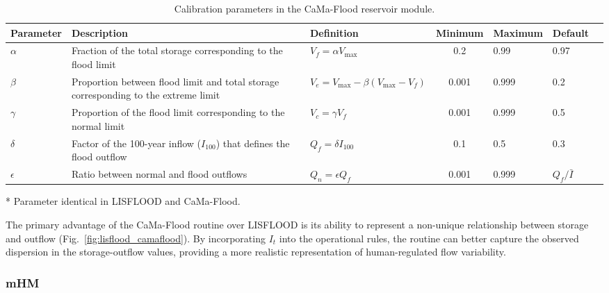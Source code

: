 \documentclass[hess, manuscript]{copernicus}
\begin{document}
\begin{table}[t]
    \centering
    \begin{threeparttable}
        \caption{Calibration parameters in the CaMa-Flood reservoir module.}
        \label{tab:parameters_camaflood}
        \begin{tabularx}{\textwidth}{lXlclll}
            \toprule
            \textbf{Parameter} & \textbf{Description} & \textbf{Definition} & \textbf{Minimum} & \textbf{Maximum} & \textbf{Default} \\
            \midrule
            $\alpha$\tnote{*} & Fraction of the total storage corresponding to the flood limit & $V_f = \alpha V_{\max}$ & 0.2 & 0.99 & 0.97 \\
            $\beta$ & Proportion between flood limit and total storage corresponding to the extreme limit & $V_e = V_{\max} - \beta (V_{\max} - V_f)$ & 0.001 & 0.999 & 0.2 \\
            $\gamma$ & Proportion of the flood limit corresponding to the normal limit & $V_c = \gamma V_f$ & 0.001 & 0.999 & 0.5 \\
            $\delta$\tnote{*} & Factor of the 100-year inflow ($I_{100}$) that defines the flood outflow & $Q_f = \delta I_{100}$ & 0.1 & 0.5 & 0.3 \\
            $\epsilon$\tnote{*} & Ratio between normal and flood outflows & $Q_n = \epsilon Q_f$ & 0.001 & 0.999 & $Q_f / \bar{I}$ \\
             \bottomrule
        \end{tabularx}
        \begin{tablenotes}
            \small
            \item{*} Parameter identical in LISFLOOD and CaMa-Flood.
        \end{tablenotes}
    \end{threeparttable}
\end{table}

The primary advantage of the CaMa-Flood routine over LISFLOOD is its ability to represent a non-unique relationship between storage and outflow (Fig.~\ref{fig:lisflood_camaflood}). By incorporating $I_t$ into the operational rules, the routine can better capture the observed dispersion in the storage-outflow values, providing a more realistic representation of human-regulated flow variability.

\subsubsection{mHM}
\label{sec:mhm}
\end{document}
